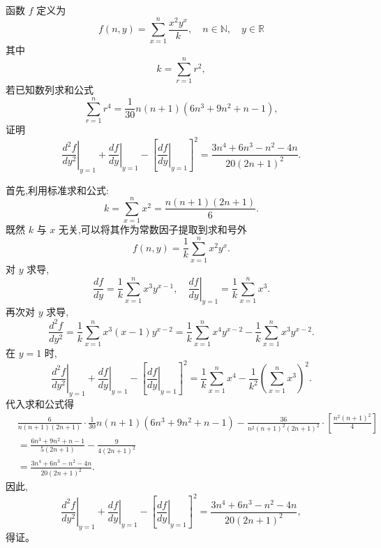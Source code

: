 \begin{questions}
    \question 函数 $f$ 定义为
    \[
    f(n, y) = \sum_{x=1}^{n} \frac{x^2 y^x}{k}, \quad n \in \mathbb{N}, \quad y \in \mathbb{R}
    \]
    其中
    \[
    k = \sum_{r=1}^{n} r^2,
    \]
    若已知数列求和公式
    \[
    \sum_{r=1}^{n} r^4 = \frac{1}{30} n(n+1)(6n^3+9n^2+n-1),
    \]
    证明
    \[
    \left. \frac{d^2f}{dy^2} \right|_{y=1} + \left. \frac{df}{dy} \right|_{y=1} - \left[ \left. \frac{df}{dy} \right|_{y=1} \right]^2 = \frac{3n^4+6n^3-n^2-4n}{20(2n+1)^2}.
    \]
    \begin{solution}
        首先,利用标准求和公式:
        \[
        k = \sum_{x=1}^{n} x^2 = \frac{n(n+1)(2n+1)}{6}.
        \]
        既然 $k$ 与 $x$ 无关,可以将其作为常数因子提取到求和号外
        \[
        f(n,y) = \frac{1}{k} \sum_{x=1}^{n} x^2 y^x.
        \]
        对 $y$ 求导,
        \[
        \frac{df}{dy} = \frac{1}{k} \sum_{x=1}^{n} x^3 y^{x-1}, \quad
        \left. \frac{df}{dy} \right|_{y=1} = \frac{1}{k} \sum_{x=1}^{n} x^3.
        \]
        再次对 $y$ 求导,
        \[
        \frac{d^2f}{dy^2} = \frac{1}{k} \sum_{x=1}^{n} x^3 (x-1) y^{x-2} = \frac{1}{k} \sum_{x=1}^{n} x^4 y^{x-2} - \frac{1}{k} \sum_{x=1}^{n} x^3 y^{x-2}.
        \]
        在 $y=1$ 时,
        \[
        \left. \frac{d^2f}{dy^2} \right|_{y=1} + \left. \frac{df}{dy} \right|_{y=1} - \left[ \left. \frac{df}{dy} \right|_{y=1} \right]^2
        = \frac{1}{k} \sum_{x=1}^{n} x^4 - \frac{1}{k^2} \left( \sum_{x=1}^{n} x^3 \right)^2.
        \]
        代入求和公式得
        \begin{align*}
        & \frac{6}{n(n+1)(2n+1)} \cdot \frac{1}{30} n(n+1)(6n^3+9n^2+n-1) - \frac{36}{n^2(n+1)^2(2n+1)^2} \cdot \left[ \frac{n^2(n+1)^2}{4} \right] \\
        &= \frac{6n^3+9n^2+n-1}{5(2n+1)} - \frac{9}{4(2n+1)^2} \\
        &= \frac{3n^4+6n^3-n^2-4n}{20(2n+1)^2}.
        \end{align*}
        因此,
        \[
        \left. \frac{d^2f}{dy^2} \right|_{y=1} + \left. \frac{df}{dy} \right|_{y=1} - \left[ \left. \frac{df}{dy} \right|_{y=1} \right]^2 = \frac{3n^4+6n^3-n^2-4n}{20(2n+1)^2},
        \]
        得证。
    \end{solution}

    \question 
\end{questions}
